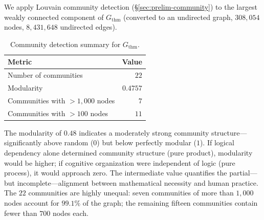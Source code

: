 We apply Louvain community detection (\S\ref{sec:prelim-community}) to the largest weakly connected component of $G_{\mathrm{thm}}$ (converted to an undirected graph, $308{,}054$ nodes, $8{,}431{,}648$ undirected edges).

\begin{table}[ht]
\centering
\caption{Community detection summary for $G_{\mathrm{thm}}$.}
\label{tab:thm-community-summary}
\begin{tabular}{lr}
\toprule
Metric & Value \\
\midrule
Number of communities & $22$ \\
Modularity & $0.4757$ \\
Communities with ${>}1{,}000$ nodes & $7$ \\
Communities with ${>}100$ nodes & $11$ \\
\bottomrule
\end{tabular}
\end{table}

The modularity of $0.48$ indicates a moderately strong community structure---significantly above random ($0$) but below perfectly modular ($1$). If logical dependency alone determined community structure (pure product), modularity would be higher; if cognitive organization were independent of logic (pure process), it would approach zero. The intermediate value quantifies the partial---but incomplete---alignment between mathematical necessity and human practice. The $22$ communities are highly unequal: seven communities of more than $1{,}000$ nodes account for $99.1\%$ of the graph; the remaining fifteen communities contain fewer than $700$ nodes each.

